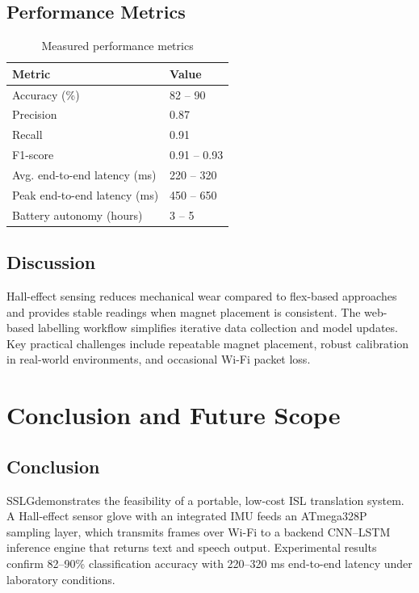 \documentclass[12pt,a4paper]{report}
\newcommand{\SystemAcronym}{SSLG}
\begin{document}
\section{Performance Metrics}
\begin{table}[H]
  \centering
  \caption{Measured performance metrics}
  \begin{tabularx}{\textwidth}{@{}lX@{}}
    \toprule
    Metric & Value \\
    \midrule
    Accuracy (\%)                 & 82 -- 90 \\
    Precision                     & 0.87 \\
    Recall                        & 0.91 \\
    F1-score                      & 0.91 -- 0.93 \\
    Avg. end-to-end latency (ms)  & 220 -- 320 \\
    Peak end-to-end latency (ms)  & 450 -- 650 \\
    Battery autonomy (hours)      & 3 -- 5 \\
    \bottomrule
  \end{tabularx}
\end{table}

\section{Discussion}
Hall-effect sensing reduces mechanical wear compared to flex-based approaches
and provides stable readings when magnet placement is consistent. The web-based
labelling workflow simplifies iterative data collection and model updates. Key
practical challenges include repeatable magnet placement, robust calibration in
real-world environments, and occasional Wi-Fi packet loss.

\chapter{Conclusion and Future Scope}
\section{Conclusion}
\SystemAcronym demonstrates the feasibility of a portable, low-cost ISL
translation system. A Hall-effect sensor glove with an integrated IMU feeds an
ATmega328P sampling layer, which transmits frames over Wi-Fi to a backend
CNN--LSTM inference engine that returns text and speech output. Experimental
results confirm 82--90\% classification accuracy with 220--320 ms end-to-end
latency under laboratory conditions.
\end{document}
